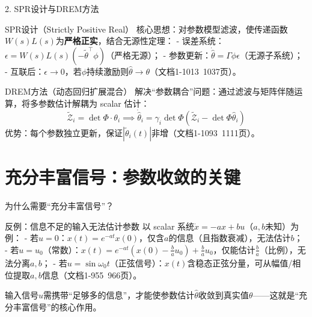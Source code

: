 \documentclass{beamer}
\begin{document}
\begin{frame}{2. SPR设计与DREM方法}
  \begin{block}{SPR设计（Strictly Positive Real）}
    核心思想：对参数模型滤波，使传递函数$W(s)L(s)$为\textbf{严格正实}，结合无源性定理：
    - 误差系统：$\epsilon=W(s)L(s)(-\tilde{\theta}^\top\phi)$（严格无源）；
    - 参数更新：$\dot{\hat{\theta}}=\Gamma\phi\epsilon$（无源子系统）；
    - 互联后：$\epsilon\to0$，若$\phi$持续激励则$\hat{\theta}\to\theta$（文档1-1013~1037页）。
  \end{block}

  \vspace{0.3cm}
  \begin{block}{DREM方法（动态回归扩展混合）}
    解决“参数耦合”问题：通过滤波与矩阵伴随运算，将多参数估计解耦为 scalar 估计：
    \[
    \tilde{\mathcal{Z}}_i=\det\Phi\cdot\theta_i \implies \dot{\hat{\theta}}_i=\gamma_i\det\Phi(\tilde{\mathcal{Z}}_i-\det\Phi\hat{\theta}_i)
    \]
    优势：每个参数独立更新，保证$|\tilde{\theta}_i(t)|$非增（文档1-1093~1111页）。
  \end{block}
\end{frame}

\section{充分丰富信号：参数收敛的关键}
\begin{frame}{为什么需要“充分丰富信号”？}
  \begin{block}{反例：信息不足的输入无法估计参数}
    以 scalar 系统$\dot{x}=-ax+bu$（$a,b$未知）为例：
    - 若$u=0$：$x(t)=e^{-at}x(0)$，仅含$a$的信息（且指数衰减），无法估计$b$；
    - 若$u=u_0$（常数）：$x(t)=e^{-at}(x(0)-\frac{b}{a}u_0)+\frac{b}{a}u_0$，仅能估计$\frac{b}{a}$（比例），无法分离$a,b$；
    - 若$u=\sin\omega_0t$（正弦信号）：$x(t)$含稳态正弦分量，可从幅值/相位提取$a,b$信息（文档1-955~966页）。
  \end{block}

  \vspace{0.3cm}
    输入信号$u$需携带“足够多的信息”，才能使参数估计$\hat{\theta}$收敛到真实值$\theta$——这就是“充分丰富信号”的核心作用。
\end{frame}
\end{document}
